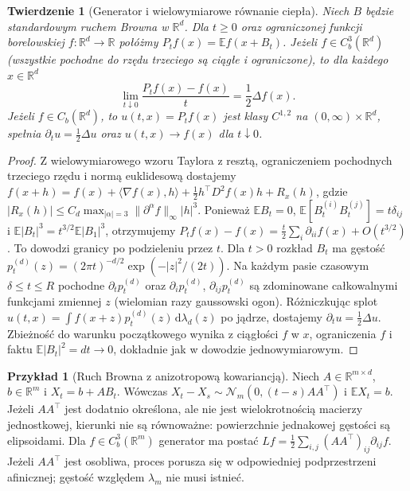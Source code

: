 \documentclass[11pt,a4paper,oneside]{report}
\numberwithin{equation}{chapter}
\theoremstyle{plain}
\newtheorem{twierdzenie}{Twierdzenie}[chapter]
\theoremstyle{definition}
\newtheorem{przyklad}{Przykład}[chapter]
\theoremstyle{remark}
\newcommand{\R}{\mathbb{R}}
\newcommand{\E}{\mathbb{E}}
\newcommand{\dd}{\mathrm{d}}
\newcommand{\Normal}{\mathcal{N}}
\begin{document}
\begin{twierdzenie}[Generator i wielowymiarowe równanie ciepła]
Niech $B$ będzie standardowym ruchem Browna w $\R^d$.
Dla $t\ge0$ oraz ograniczonej funkcji borelowskiej
$f:\R^d\to\R$ połóżmy $P_tf(x)=\E f(x+B_t)$.
Jeżeli $f\in C_b^3(\R^d)$ (wszystkie pochodne do rzędu trzeciego
są ciągłe i ograniczone), to dla każdego $x\in\R^d$
\[
\lim_{t\downarrow0}\frac{P_tf(x)-f(x)}{t}=\frac12\Delta f(x).
\]
Jeżeli $f\in C_b(\R^d)$, to $u(t,x)=P_tf(x)$ jest klasy
$C^{1,2}$ na $(0,\infty)\times\R^d$, spełnia
$\partial_tu=\frac12\Delta u$ oraz $u(t,x)\to f(x)$ dla $t\downarrow0$.
\end{twierdzenie}
\begin{proof}
Z wielowymiarowego wzoru Taylora z resztą, ograniczeniem
pochodnych trzeciego rzędu i normą euklidesową dostajemy
$f(x+h)=f(x)+\langle\nabla f(x),h\rangle+
\frac12 h^\top D^2f(x)h+R_x(h)$, gdzie
$|R_x(h)|\le C_d\max_{|\alpha|=3}\|\partial^\alpha f\|_\infty|h|^3$.
Ponieważ $\E B_t=0$,
$\E[B_t^{(i)}B_t^{(j)}]=t\delta_{ij}$ i
$\E|B_t|^3=t^{3/2}\E|B_1|^3$, otrzymujemy
$P_tf(x)-f(x)=\frac{t}{2}\sum_i\partial_{ii}f(x)+O(t^{3/2})$.
To dowodzi granicy po podzieleniu przez $t$.
Dla $t>0$ rozkład $B_t$ ma gęstość
$p_t^{(d)}(z)=(2\pi t)^{-d/2}\exp(-|z|^2/(2t))$.
Na każdym pasie czasowym $\delta\le t\le R$ pochodne
$\partial_t p_t^{(d)}$ oraz $\partial_i p_t^{(d)}$,
$\partial_{ij}p_t^{(d)}$ są zdominowane całkowalnymi
funkcjami zmiennej $z$ (wielomian razy gaussowski ogon).
Różniczkując splot $u(t,x)=\int f(x+z)p_t^{(d)}(z)\,\dd\lambda_d(z)$
po jądrze, dostajemy $\partial_tu=\frac12\Delta u$.
Zbieżność do warunku początkowego wynika z ciągłości $f$ w $x$,
ograniczenia $f$ i faktu $\E|B_t|^2=dt\to0$, dokładnie jak
w dowodzie jednowymiarowym.
\end{proof}

\begin{przyklad}[Ruch Browna z anizotropową kowariancją]
Niech $A\in\R^{m\times d}$, $b\in\R^m$ i $X_t=b+AB_t$.
Wówczas $X_t-X_s\sim\Normal_m(0,(t-s)AA^\top)$ i
$\E X_t=b$. Jeżeli $AA^\top$ jest dodatnio określona, ale nie jest wielokrotnością
macierzy jednostkowej, kierunki nie są równoważne: powierzchnie
jednakowej gęstości są elipsoidami. Dla
$f\in C_b^3(\R^m)$ generator ma postać
$Lf=\frac12\sum_{i,j}(AA^\top)_{ij}\partial_{ij}f$.
Jeżeli $AA^\top$ jest osobliwa, proces porusza się w
odpowiedniej podprzestrzeni afinicznej; gęstość względem
$\lambda_m$ nie musi istnieć.
\end{przyklad}
\end{document}

